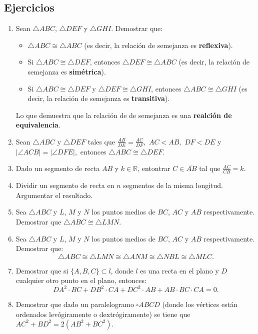 \subsection*{Ejercicios}
\begin{enumerate}
\item Sean $\triangle ABC$, $\triangle DEF$ y $\triangle GHI$. Demostrar que:
\begin{itemize}
\item $\triangle ABC \cong \triangle ABC$ (es decir, la relación de semejanza es {\bf {reflexiva}}).
\item Si $\triangle ABC \cong \triangle DEF$, entonces $\triangle DEF \cong \triangle ABC$ (es decir, la relación de semejanza es {\bf {simétrica}}).
\item Si $\triangle ABC \cong \triangle DEF$ y $\triangle DEF \cong \triangle GHI$, entonces $\triangle ABC \cong \triangle GHI$ (es decir, la relación de semejanza es {\bf {transitiva}}).
\end{itemize}
Lo que demuestra que la relación de de semejanza es una {\bf{realción de equivalencia}}.
\item Sean $\triangle ABC$ y $\triangle DEF$ tales que $\frac{AB}{DE}=\frac{AC}{DF},$ $AC<AB,$ $DF<DE$ y $|\angle ACB|=|\angle DFE|,$ entonces $\triangle ABC\cong \triangle DEF.$
\item Dado un segmento de recta $AB$ y $k \in \mathbb{R}$, entontrar $C \in \overline{AB}$ tal que $\frac{AC}{CB}=k.$
\item Dividir un segmento de recta en $n$ segmentos de la misma longitud. Argumentar el resultado. 
\item Sea $\triangle ABC$ y $L$, $M$ y $N$ los puntos medios de $BC$, $AC$ y $AB$ respectivamente. Demostrar que $\triangle ABC \cong \triangle LMN.$
\item Sea $\triangle ABC$ y $L$, $M$ y $N$ los puntos medios de $BC$, $AC$ y $AB$ respectivamente. Demostrar que:
$$\triangle ABC \cong \triangle LMN \cong \triangle ANM \cong \triangle NBL \cong \triangle MLC.$$
\item Demostrar que si $\{A, B, C\}\subset l$, donde $l$ es una recta en el plano y $D$ cualquier otro punto en el plano, entonces: 
$$DA^{2}\cdot BC+ DB^{2}\cdot CA+ DC^{2}\cdot AB+ AB\cdot BC\cdot CA=0.$$
\item Demostrar que dado un paralelogramo $\square ABCD$ (donde los vértices están ordenados levógiramente o dextrógiramente) se tiene que $AC^{2}+BD^{2}=2(AB^{2}+BC^{2}).$
\end{enumerate}

